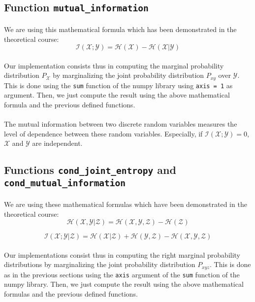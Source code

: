 \documentclass[a4paper, 11pt, oneside]{article}
\begin{document}
\subsection{Function \texttt{mutual\_information}}

\paragraph{}We are using this mathematical formula which has been demonstrated in the theoretical course: 
$$ \mathcal{I}(\mathcal{X}; \mathcal{Y}) = \mathcal{H}(\mathcal{X}) - \mathcal{H}(\mathcal{X}| \mathcal{Y})$$

\paragraph{}Our implementation consists thus in computing the marginal probability distribution $P_\mathcal{X}$ by marginalizing the joint probability distribution $P_{xy}$ over $\mathcal{Y}$. This is done using the \texttt{sum} function of the numpy library using \texttt{axis = 1} as argument. Then, we just compute the result using the above mathematical formula and the previous defined functions.

\paragraph{}The mutual information between two discrete random variables measures the level of dependence between these random variables. Especially, if $\mathcal{I}(\mathcal{X}; \mathcal{Y}) = 0$, $\mathcal{X}$ and $\mathcal{Y}$ are independent.

\subsection{Functions \texttt{cond\_joint\_entropy} and \texttt{cond\_mutual\_information}}

\paragraph{}We are using these mathematical formulas which have been demonstrated in the theoretical course: 
$$ \mathcal{H}(\mathcal{X}, \mathcal{Y} | \mathcal{Z}) = \mathcal{H}(\mathcal{X}, \mathcal{Y}, \mathcal{Z}) - \mathcal{H}(\mathcal{Z})$$

$$ \mathcal{I}(\mathcal{X}; \mathcal{Y} | \mathcal{Z}) = \mathcal{H}(\mathcal{X} | \mathcal{Z}) + \mathcal{H}(\mathcal{Y}, \mathcal{Z}) - \mathcal{H}(\mathcal{X}, \mathcal{Y}, \mathcal{Z})$$

\paragraph{}Our implementations consist thus in computing the right marginal probability distributions by marginalizing the joint probability distribution $P_{xyz}$. This is done as in the previous sections using the \texttt{axis} argument of the \texttt{sum} function of the numpy library. Then, we just compute the result using the above mathematical formulas and the previous defined functions.

\end{document}
